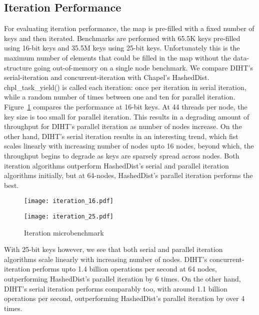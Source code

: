 \documentclass[letterpaper, 10 pt, conference]{ieeeconf}  %
\begin{document}
\subsection{Iteration Performance}
For evaluating iteration performance, the map is pre-filled with a fixed number of keys and then iterated. Benchmarks are performed with 65.5K keys pre-filled using 16-bit keys and 35.5M keys using 25-bit keys. Unfortunately this is the maximum number of elements that could be filled in the map without the data-structure going out-of-memory on a single node benchmark. We compare DIHT's serial-iteration and concurrent-iteration with Chapel's HashedDist. chpl\_task\_yield() is called each iteration: once per iteration in serial iteration, while a random number of times between one and ten for parallel iteration. Figure~\ref{fig:iteration} compares the performance at 16-bit keys. At 44 threads per node, the key size is too small for parallel iteration. This results in a degrading amount of throughput for DIHT's parallel iteration as number of nodes increase. On the other hand, DIHT's serial iteration results in an interesting trend, which fist scales linearly with increasing number of nodes upto 16 nodes, beyond which, the throughput begins to degrade as keys are sparsely spread across nodes. Both iteration algorithms outperform HashedDist's serial and parallel iteration algorithms initially, but at 64-nodes, HashedDist's parallel iteration performs the best.
\begin{figure}
    \centering
    \begin{minipage}[b]{0.5\textwidth}
        \texttt{[image: iteration\_16.pdf]}
    \end{minipage}
    \hfill
      \begin{minipage}[b]{0.5\textwidth}
        \texttt{[image: iteration\_25.pdf]}
     \end{minipage}
    \caption{Iteration microbenchmark}
    \label{fig:iteration}
\end{figure}

With 25-bit keys however, we see that both serial and parallel iteration algorithms scale linearly with increasing number of nodes. DIHT's concurrent-iteration performs upto 1.4 billion operations per second at 64 nodes, outperforming HashedDist's parallel iteration by 6 times. On the other hand, DIHT's serial iteration performs comparably too, with around 1.1 billion operations per second, outperforming HashedDist's parallel iteration by over 4 times.
\end{document}
